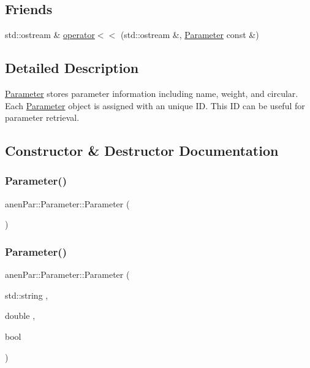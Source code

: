 \subsection*{Friends}
\begin{DoxyCompactItemize}
\item 
std\+::ostream \& \mbox{\hyperlink{classanen_par_1_1_parameter_a062fa105b64c362071304bc5f2eb350a}{operator$<$$<$}} (std\+::ostream \&, \mbox{\hyperlink{classanen_par_1_1_parameter}{Parameter}} const \&)
\end{DoxyCompactItemize}


\subsection{Detailed Description}
\mbox{\hyperlink{classanen_par_1_1_parameter}{Parameter}} stores parameter information including name, weight, and circular. Each \mbox{\hyperlink{classanen_par_1_1_parameter}{Parameter}} object is assigned with an unique ID. This ID can be useful for parameter retrieval. 

\subsection{Constructor \& Destructor Documentation}
\mbox{\label{classanen_par_1_1_parameter_aada3139ee9b50c2acb90d275c72da550}} 
\subsubsection{\texorpdfstring{Parameter()}{Parameter()}\hspace{0.1cm}{\footnotesize\ttfamily [1/3]}}
{\footnotesize\ttfamily anen\+Par\+::\+Parameter\+::\+Parameter (\begin{DoxyParamCaption}{ }\end{DoxyParamCaption})}

\mbox{\label{classanen_par_1_1_parameter_a2c0360abe051ca5ca67d812f75987918}} 
\subsubsection{\texorpdfstring{Parameter()}{Parameter()}\hspace{0.1cm}{\footnotesize\ttfamily [2/3]}}
{\footnotesize\ttfamily anen\+Par\+::\+Parameter\+::\+Parameter (\begin{DoxyParamCaption}\item[{std\+::string}]{,  }\item[{double}]{,  }\item[{bool}]{ }\end{DoxyParamCaption})}

